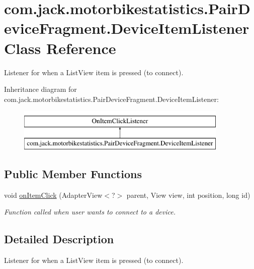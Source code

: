 \hypertarget{classcom_1_1jack_1_1motorbikestatistics_1_1_pair_device_fragment_1_1_device_item_listener}{}\section{com.\+jack.\+motorbikestatistics.\+Pair\+Device\+Fragment.\+Device\+Item\+Listener Class Reference}
\label{classcom_1_1jack_1_1motorbikestatistics_1_1_pair_device_fragment_1_1_device_item_listener}


Listener for when a List\+View item is pressed (to connect).  


Inheritance diagram for com.\+jack.\+motorbikestatistics.\+Pair\+Device\+Fragment.\+Device\+Item\+Listener\+:\begin{figure}[H]
\begin{center}
\leavevmode
\includegraphics[height=2.000000cm]{classcom_1_1jack_1_1motorbikestatistics_1_1_pair_device_fragment_1_1_device_item_listener}
\end{center}
\end{figure}
\subsection*{Public Member Functions}
\begin{DoxyCompactItemize}
\item 
void \hyperlink{classcom_1_1jack_1_1motorbikestatistics_1_1_pair_device_fragment_1_1_device_item_listener_ac059da38636222d0dc280176c46dfc3e}{on\+Item\+Click} (Adapter\+View$<$?$>$ parent, View view, int position, long id)
\begin{DoxyCompactList}\small\item\em Function called when user wants to connect to a device. \end{DoxyCompactList}\end{DoxyCompactItemize}


\subsection{Detailed Description}
Listener for when a List\+View item is pressed (to connect). 

